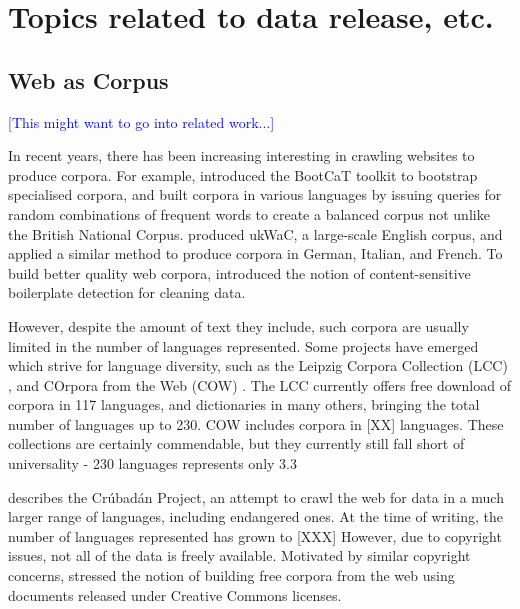 \section{Topics related to data release, etc.}


\subsection{Web as Corpus}

\textcolor{blue}{[This might want to go into related work...]}

In recent years, there has been increasing interesting in crawling websites to produce corpora. For example,  introduced the BootCaT toolkit to bootstrap specialised corpora, and  built corpora in various languages by issuing queries for random combinations of frequent words to create a balanced corpus not unlike the British National Corpus.  produced ukWaC, a large-scale English corpus, and \cite{baroni2009wacky} applied a similar method to produce corpora in German, Italian, and French. To build better quality web corpora,  introduced the notion of content-sensitive boilerplate detection for cleaning data.

However, despite the amount of text they include, such corpora are usually limited in the number of languages represented. Some projects have emerged which strive for language diversity, such as the Leipzig Corpora Collection (LCC) \cite{biemann2007leipzig}, and COrpora from the Web (COW) \cite{schaefer2012cow}. The LCC currently offers free download of corpora in 117 languages, and dictionaries in many others, bringing the total number of languages up to 230. COW includes corpora in [XX] languages. These collections are certainly commendable, but they currently still fall short of universality - 230 languages represents only 3.3%

 describes the Crúbadán Project, an attempt to crawl the web for data in a much larger range of languages, including endangered ones. At the time of writing, the number of languages represented has grown to [XXX] However, due to copyright issues, not all of the data is freely available. Motivated by similar copyright concerns,  stressed the notion of building free corpora from the web using documents released under Creative Commons licenses.

